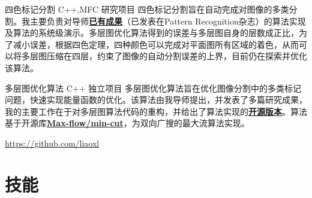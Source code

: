 \documentclass[11pt,a4paper,sans]{moderncv}   %
\begin{document}
\begin{CJK}{UTF8}{gbsn}
{四色标记分割}
{C++,MFC}
{研究项目}{}
{四色标记分割旨在自动完成对图像的多类分割。我主要负责对导师\textbf{\href{http://www.sciencedirect.com/science/article/pii/S0031320311001907}{已有成果}}（已发表在Pattern Recognition杂志）的算法实现及算法的系统级演示。多层图优化算法得到的误差与多层图自身的层数成正比，为了减小误差，根据四色定理，四种颜色可以完成对平面图所有区域的着色，从而可以将多层图压缩在四层，约束了图像的自动分割误差的上界，目前仍在探索并优化该算法。}
\vspace*{0.2\baselineskip}

{多层图优化算法}
{C++}
{独立项目}{}
{多层图优化算法旨在优化图像分割中的多类标记问题，快速实现能量函数的优化。该算法由我导师提出，并发表了多篇研究成果，我的主要工作在于对多层图算法代码的重构，并给出了算法实现的\textbf{\href{https://github.com/liaoxl/MultiLayerGraph}{开源版本}}。算法基于开源库\textbf{\href{http://vision.csd.uwo.ca/code/}{Max-flow/min-cut}}，为双向广搜的最大流算法实现。}
\vspace*{0.2\baselineskip}

{\href{https://github.com/liaoxl}{https://github.com/liaoxl}}
{}{}{}{}


\renewcommand{\baselinestretch}{1.0}


\section{技能}


\closesection{}                   %
\renewcommand{\listitemsymbol}{-} %
\clearpage\end{CJK}
\end{document}
